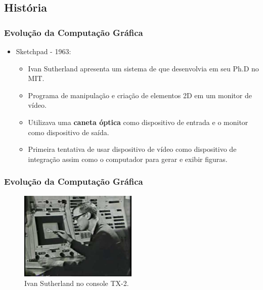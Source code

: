 \documentclass{beamer}
\begin{document}
\subsection{História}
\begin{frame}
\frametitle{Evolução da Computação Gráfica}

\begin{block}


\begin{itemize}
	\item<1-> Sketchpad - 1963:
	\begin{itemize}
		\item<1-> Ivan Sutherland apresenta um sistema de que desenvolvia em seu Ph.D no MIT.
		\item<1-> Programa de manipulação e criação de elementos 2D em um monitor de vídeo.
		\item<1-> Utilizava uma \textbf{caneta óptica} como dispositivo de entrada e o monitor como dispositivo de saída.
		
		\item<1-> Primeira tentativa de usar dispositivo de vídeo como dispositivo de integração assim como o computador para gerar e exibir figuras.
	\end{itemize}
	

\end{itemize}
\end{block}

\end{frame}



\begin{frame}
\frametitle{Evolução da Computação Gráfica}
	\begin{figure}[!h]
			\begin{center}
			\includegraphics[width=0.5\textwidth]{Figures/ivan}
			\caption{Ivan Sutherland no console TX-2.}\label{ivan}
			\end{center}
	\end{figure}
\end{frame}
\end{document}
